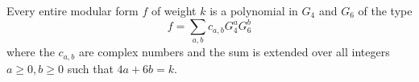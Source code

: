 Every entire modular form $f$ of weight $k$ is a polynomial in $G_4$ and $G_6$ of the type
$$
f = \sum_{a,b} c_{a,b} G_4^a G_6^b
$$
where the $c_{a,b}$ are complex numbers and the sum is extended over all integers $a \geq 0, b \geq 0$ such that $4a + 6b = k$.
